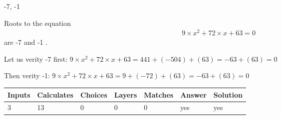 \documentclass[12pt]{article}
\begin{document}
-7,  %
-1
 
 
 
\noindent{}
 
 

 
 
 
\noindent{}
 
 

Roots to the equation
\begin{eqnarray*}
9 \times x^2  %
+  %
72
                 \times x    %
+  %
63 =0
\end{eqnarray*}
are  %
-7 and  %
-1 .
 
Let us verity  %
-7 first:
$  %
9 \times x^2  %
+  %
72
                 \times x    %
+  %
63
  = %
441+( %
-504)+( %
63)
  = %
-63+( %
63)
  = %
0
$
 
Then verity  %
-1:
$  %
9 \times x^2  %
+  %
72
                 \times x    %
+  %
63
  = %
9+( %
-72)+( %
63)
  = %
-63+( %
63)
  = %
0
$
 
 
 
\noindent{}
 
 

 
\vspace{0.3in}
   
   
   
   
\noindent\begin{tabular}{|l|l|l|l|l|l|l|}
 \hline
Inputs & Calculates & Choices & Layers & Matches & Answer & Solution \\ \hline
           3 & 
          13 & 
           0
  & 
           0 & 
           0 & 
  yes & 
  yes 
  \\ \hline
 \end{tabular}
   
   
   
   
\noindent{}
   
   
  
\end{document}
